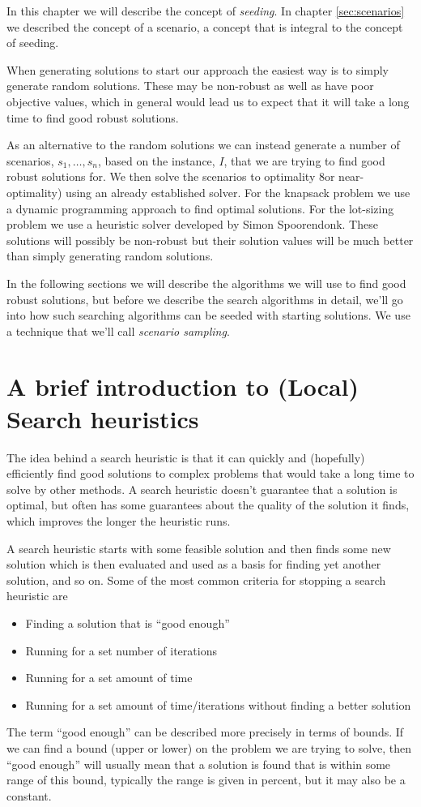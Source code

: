 In this chapter we will describe the concept of \emph{seeding}.
In chapter \ref{sec:scenarios} we described the concept of a scenario,
a concept that is integral to the concept of seeding. 

When generating solutions to start our approach the easiest way is to
simply generate random solutions. These may be non-robust as well as
have poor objective values, which in general would lead us to expect
that it will take a long time to find good robust solutions.

As an alternative to the random solutions we can instead generate a
number of scenarios, $s_1, \ldots, s_n$, based on the instance, $I$,
that we are trying to find good robust solutions for. We then solve
the scenarios to optimality 8or near-optimality) using an already
established solver. For the knapsack problem we use a dynamic
programming approach to find optimal solutions. For the lot-sizing
problem we use a heuristic solver developed by Simon Spoorendonk.
These solutions will possibly be non-robust but their solution values
will be much better than simply generating random solutions.

In the following sections we will describe the algorithms we will
use to find good robust solutions, but before we describe the search
algorithms in detail, we'll go into how such searching algorithms can
be seeded with starting solutions. We use a technique that we'll call
\emph{scenario sampling}. 






\section{A brief introduction to (Local) Search heuristics}
\label{sec:search_heuristics}
The idea behind a search heuristic is that it can quickly and
(hopefully) efficiently find good solutions to complex problems that
would take a long time to solve by other methods.
A search heuristic doesn't guarantee that a solution is optimal, but
often has some guarantees about the quality of the solution it finds,
which improves the longer the heuristic runs.

A search heuristic starts with some feasible solution and then finds
some new solution which is then evaluated and used as a basis for
finding yet another solution, and so on. Some of the most common
criteria for stopping a search heuristic are
\begin{itemize}
\item Finding a solution that is ``good enough''
\item Running for a set number of iterations
\item Running for a set amount of time
\item Running for a set amount of time/iterations without finding a
  better solution
\end{itemize}
The term ``good enough'' can be described more precisely in terms of
bounds. If we can find a bound (upper or lower) on the problem we are
trying to solve, then ``good enough'' will usually mean that a
solution is found that is within some range of this bound, typically
the range is given in percent, but it may also be a constant.

